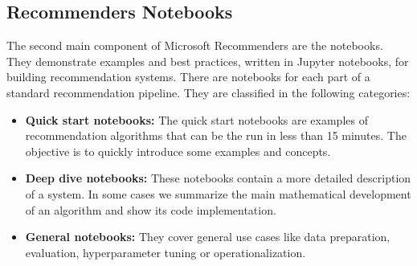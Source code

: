 \subsection{Recommenders Notebooks}

The second main component of Microsoft Recommenders are the notebooks. They demonstrate examples and best practices, 
written in Jupyter notebooks, for building recommendation systems.
There are notebooks for each part of a standard recommendation pipeline. They are
classified in the following categories:
\begin{itemize}
    \item \textbf{Quick start notebooks:} The quick start notebooks are examples of recommendation algorithms that 
    can be the run in less than 15 minutes. The objective is to quickly introduce some examples and concepts.
    \item \textbf{Deep dive notebooks:} These notebooks contain a more detailed description of a system. In some cases
    we summarize the main mathematical development of an algorithm and show its code implementation.
    \item \textbf{General notebooks:} They cover general use cases like data preparation, evaluation, hyperparameter
    tuning or operationalization.
\end{itemize}

